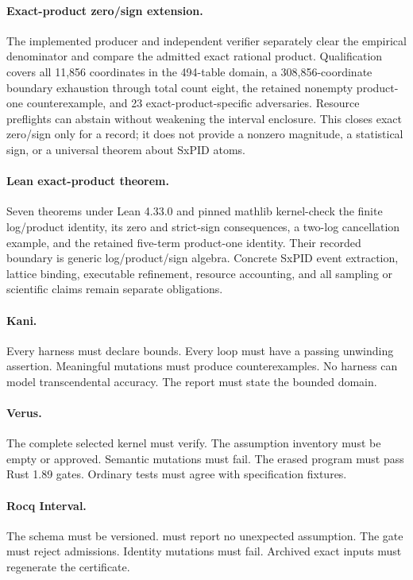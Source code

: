 \documentclass[11pt]{article}
\begin{document}
\paragraph{Exact-product zero/sign extension.}
The implemented producer and independent verifier separately clear the empirical denominator and
compare the admitted exact rational product.  Qualification covers all 11,856 coordinates in the
494-table domain, a 308,856-coordinate boundary exhaustion through total count eight, the retained
nonempty product-one counterexample, and 23 exact-product-specific adversaries.  Resource
preflights can abstain without weakening the interval enclosure.  This closes exact zero/sign only
for a  record; it does not provide a nonzero magnitude, a statistical sign, or a
universal theorem about SxPID atoms.

\paragraph{Lean exact-product theorem.}
Seven theorems under Lean 4.33.0 and pinned mathlib kernel-check the finite log/product identity,
its zero and strict-sign consequences, a two-log cancellation example, and the retained five-term
product-one identity.  Their recorded boundary is generic log/product/sign algebra.  Concrete
SxPID event extraction, lattice binding, executable refinement, resource accounting, and all
sampling or scientific claims remain separate obligations.

\paragraph{Kani.}
Every harness must declare bounds.  Every loop must have a passing unwinding assertion.  Meaningful
mutations must produce counterexamples.  No harness can model transcendental accuracy.  The report
must state the bounded domain.

\paragraph{Verus.}
The complete selected kernel must verify.  The assumption inventory must be empty or approved.
Semantic mutations must fail.  The erased program must pass Rust 1.89 gates.  Ordinary tests must
agree with specification fixtures.

\paragraph{Rocq Interval.}
The schema must be versioned.   must report no unexpected assumption.  The gate
must reject admissions.  Identity mutations must fail.  Archived exact inputs must regenerate the
certificate.
\end{document}
